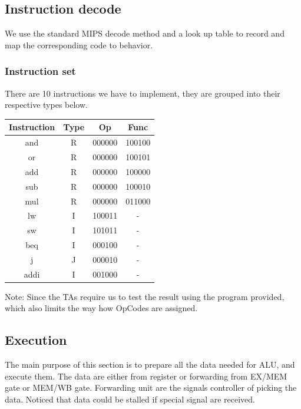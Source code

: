 \documentclass[11pt, a4paper]{article}
\begin{document}
\subsection{Instruction decode}
\par We use the standard MIPS decode method and a look up table to record and map the corresponding code to behavior.

\subsubsection{Instruction set}
\par There are 10 instructions we have to implement, they are grouped into their respective types below. 

\begin{table}[h]
	\centering
	\begin{tabular}{|c|ccc|}
	\hline
    Instruction & Type & Op & Func\\
    \hline
    and & R & 000000 & 100100 \\
    or & R & 000000 & 100101 \\
    add & R & 000000 & 100000 \\
    sub & R & 000000 & 100010 \\
    mul & R & 000000 & 011000 \\
    lw & I & 100011 & - \\
    sw & I & 101011 & - \\
    beq & I & 000100 & - \\
    j & J & 000010 & - \\
    addi & I & 001000 & - \\
    \hline
	\end{tabular}
\end{table}

Note: Since the TAs require us to test the result using the program provided, which also limits the way how OpCodes are assigned.\\


\subsection{Execution}
\par The main purpose of this section is to prepare all the data needed for ALU, and execute them. The data are either from register or forwarding from EX/MEM gate or MEM/WB gate. Forwarding unit are the signals controller of picking the data. Noticed that data could be stalled if special signal are received. 
\end{document}
